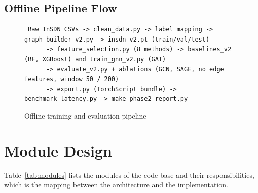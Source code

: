 \subsection{Offline Pipeline Flow}

\begin{figure}[htbp]
\centering
\scriptsize
\begin{verbatim}
 Raw InSDN CSVs -> clean_data.py -> label mapping -> graph_builder_v2.py -> insdn_v2.pt (train/val/test)
      -> feature_selection.py (8 methods) -> baselines_v2 (RF, XGBoost) and train_gnn_v2.py (GAT)
      -> evaluate_v2.py + ablations (GCN, SAGE, no edge features, window 50 / 200)
      -> export.py (TorchScript bundle) -> benchmark_latency.py -> make_phase2_report.py
\end{verbatim}
\caption{Offline training and evaluation pipeline}
\label{fig:offline}
\end{figure}


\section{Module Design}
Table~\ref{tab:modules} lists the modules of the code base and their responsibilities, which is the mapping between the architecture and the implementation.


